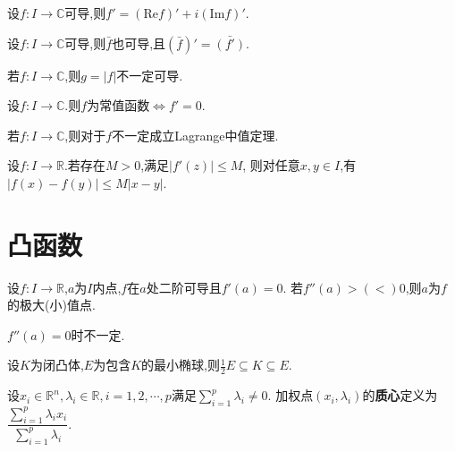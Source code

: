 \begin{prop}
    设$f:I\to\mathbb{C}$可导,则$f'=(\mathrm{Re}f)'+i(\mathrm{Im}f)'$.
\end{prop}

\begin{prop}
    设$f:I\to\mathbb{C}$可导,则$\bar{f}$也可导,且$(\bar{f})'=\bar{(f')}$.
\end{prop}

\begin{rqq}
    若$f:I\to\mathbb{C}$,则$g=\left\lvert f \right\rvert$不一定可导.
\end{rqq}

\begin{prop}
    设$f:I\to\mathbb{C}$.则$f$为常值函数$\Leftrightarrow$$f'=0$.
\end{prop}

\begin{rqq}
    若$f:I\to\mathbb{C}$,则对于$f$不一定成立Lagrange中值定理.
\end{rqq}

\begin{thm}
    设$f:I\to\mathbb{R}$.若存在$M>0$,满足$\left\lvert f'(z) \right\rvert \leqslant M$,
    则对任意$x,y\in I$,有$\left\lvert f(x)-f(y) \right\rvert \leqslant 
    M \left\lvert x-y \right\rvert$.
\end{thm}

\section{凸函数}

\begin{thm}
    设$f:I\to\mathbb{R}$,$a$为$I$内点,$f$在$a$处二阶可导且$f'(a)=0$.
    若$f''(a)>(<)0$,则$a$为$f$的极大(小)值点.
\end{thm}

\begin{rqq}
    $f''(a)=0$时不一定.
\end{rqq}

\begin{lem}[John]
    设$K$为闭凸体,$E$为包含$K$的最小椭球,则$\frac{1}{2} E \subseteq K \subseteq E$.
\end{lem}

\begin{deff}
    设$x_i\in\mathbb{R}^n,\lambda_i\in\mathbb{R},i=1,2,\cdots,p$满足$\sum\limits_{i=1}^p\lambda_i\neq0$.
    加权点$(x_i,\lambda_i)$的\textbf{质心}定义为$\dfrac{\sum\limits_{i=1}^p\lambda_ix_i}{\sum\limits_{i=1}^p\lambda_i}$.
\end{deff}

